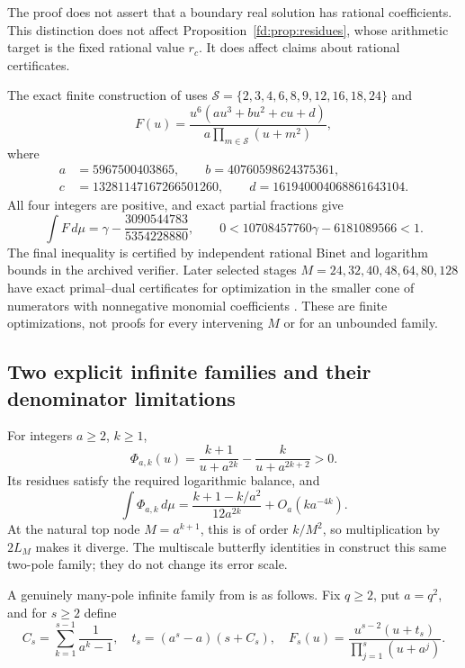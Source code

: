 \documentclass[11pt,a4paper]{article}
\theoremstyle{definition}
\theoremstyle{remark}
\numberwithin{equation}{section}
\begin{document}
The proof does not assert that a boundary real solution has rational
coefficients.  This distinction does not affect
Proposition~\ref{fd:prop:residues}, whose arithmetic target is the fixed
rational value $r_c$.  It does affect claims about rational certificates.

The exact finite construction of \cite{fd:positivev2} uses
$\mathcal S=\{2,3,4,6,8,9,12,16,18,24\}$ and
\[
 F(u)=\frac{u^6(au^3+bu^2+cu+d)}{a\prod_{m\in\mathcal S}(u+m^2)},
\]
where
\[
 \begin{split}
 a&=5967500403865,\qquad b=40760598624375361,\\
 c&=13281147167266501260,\qquad d=161940004068861643104.
 \end{split}
\]
All four integers are positive, and exact partial fractions give
\[
 \int F\,d\mu=\gamma-\frac{3090544783}{5354228880},
 \qquad 0<10708457760\gamma-6181089566<1.
\]
The final inequality is certified by independent rational Binet and
logarithm bounds in the archived verifier.  Later selected stages
$M=24,32,40,48,64,80,128$ have exact primal--dual certificates for
optimization in the smaller cone of numerators with nonnegative monomial
coefficients \cite{fd:uniformv3}.  These are finite optimizations, not
proofs for every intervening $M$ or for an unbounded family.

\subsection{Two explicit infinite families and their denominator limitations}
For integers $a\ge2$, $k\ge1$,
\[
 \Phi_{a,k}(u)=\frac{k+1}{u+a^{2k}}-\frac{k}{u+a^{2k+2}}>0.
\]
Its residues satisfy the required logarithmic balance, and
\[
 \int\Phi_{a,k}\,d\mu
 =\frac{k+1-k/a^2}{12a^{2k}}+O_a(ka^{-4k}).
\]
At the natural top node $M=a^{k+1}$, this is of order $k/M^2$, so
multiplication by $2L_M$ makes it diverge.  The multiscale butterfly
identities in \cite{fd:multiscale} construct this same two-pole family;
they do not change its error scale.

A genuinely many-pole infinite family from \cite{fd:uniformv3} is as
follows.  Fix $q\ge2$, put $a=q^2$, and for $s\ge2$ define
\[
 C_s=\sum_{k=1}^{s-1}\frac1{a^k-1},\quad
 t_s=(a^s-a)(s+C_s),\quad
 F_s(u)=\frac{u^{s-2}(u+t_s)}{\prod_{j=1}^s(u+a^j)}.
\]
\end{document}
